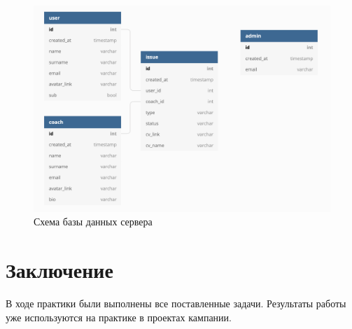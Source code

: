 \documentclass[a4papaer,12pt]{article}
\begin{document}
\begin{figure}[H]
    \centering
    \includegraphics[width=0.7\linewidth]{3}
    \caption{Схема базы данных сервера}
\end{figure}

\section{Заключение}

В ходе практики были выполнены все поставленные задачи. Результаты работы уже используются на
практике в проектах кампании.



\end{document}
